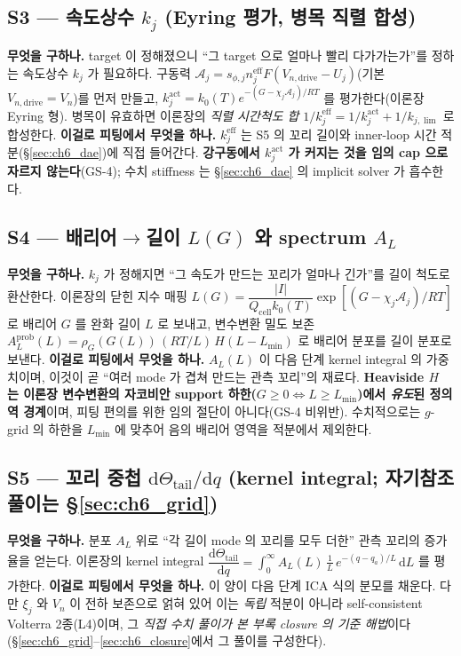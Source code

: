 \documentclass[11pt,a4paper]{article}
\newcommand{\dd}{\mathrm{d}}
\newcommand{\eff}{\mathrm{eff}}
\newcommand{\drive}{\mathrm{drive}}
\newcommand{\cell}{\mathrm{cell}}
\begin{document}
\subsection{S3 — 속도상수 $k_j$ (Eyring 평가, 병목 직렬 합성)}\label{sec:ch6_S3}
\textbf{무엇을 구하나.} target 이 정해졌으니 ``그 target 으로 얼마나 빨리 다가가는가''를 정하는 속도상수 $k_j$ 가
필요하다. 구동력 $\mathcal A_j=s_{\phi,j}n_j^{\eff}F(V_{n,\drive}-U_j)$(기본 $V_{n,\drive}=V_n$)를 먼저 만들고,
$k_j^{\mathrm{act}}=k_0(T)e^{-(G-\chi_j\mathcal A_j)/RT}$ 를 평가한다(이론장 Eyring 형). 병목이 유효하면 이론장의
\emph{직렬 시간척도 합} $1/k_j^{\eff}=1/k_j^{\mathrm{act}}+1/k_{j,\lim}$ 로 합성한다.
\textbf{이걸로 피팅에서 무엇을 하나.} $k_j^{\eff}$ 는 S5 의 꼬리 길이와 inner-loop 시간 적분(\S\ref{sec:ch6_dae})에
직접 들어간다. \textbf{강구동에서 $k_j^{\mathrm{act}}$ 가 커지는 것을 임의 cap 으로 자르지 않는다}(GS-4); 수치
stiffness 는 \S\ref{sec:ch6_dae} 의 implicit solver 가 흡수한다.

\subsection{S4 — 배리어$\to$길이 $L(G)$ 와 spectrum $A_L$}\label{sec:ch6_S4}
\textbf{무엇을 구하나.} $k_j$ 가 정해지면 ``그 속도가 만드는 꼬리가 얼마나 긴가''를 길이 척도로 환산한다. 이론장의
닫힌 지수 매핑 $L(G)=\dfrac{|I|}{Q_\cell k_0(T)}\exp[(G-\chi_j\mathcal A_j)/RT]$ 로 배리어 $G$ 를 완화 길이 $L$ 로
보내고, 변수변환 밀도 보존 $A_L^{\mathrm{prob}}(L)=\rho_G(G(L))\,(RT/L)\,H(L-L_{\min})$ 로 배리어 분포를 길이
분포로 보낸다.
\textbf{이걸로 피팅에서 무엇을 하나.} $A_L(L)$ 이 다음 단계 kernel integral 의 가중치이며, 이것이 곧 ``여러 mode
가 겹쳐 만드는 관측 꼬리''의 재료다. \textbf{Heaviside $H$ 는 이론장 변수변환의 자코비안 support
하한($G\ge0\Leftrightarrow L\ge L_{\min}$)에서 \emph{유도}된 정의역 경계}이며, 피팅 편의를 위한 임의 절단이
아니다(GS-4 비위반). 수치적으로는 $g$-grid 의 하한을 $L_{\min}$ 에 맞추어 음의 배리어 영역을 적분에서 제외한다.

\subsection{S5 — 꼬리 중첩 $\dd\Theta_\mathrm{tail}/\dd q$ (kernel integral; 자기참조 풀이는 \S\ref{sec:ch6_grid})}\label{sec:ch6_S5}
\textbf{무엇을 구하나.} 분포 $A_L$ 위로 ``각 길이 mode 의 꼬리를 모두 더한'' 관측 꼬리의 증가율을 얻는다. 이론장의
kernel integral $\dfrac{\dd\Theta_\mathrm{tail}}{\dd q}=\int_0^\infty A_L(L)\,\tfrac1L\,e^{-(q-q_a)/L}\,\dd L$ 를
평가한다. \textbf{이걸로 피팅에서 무엇을 하나.} 이 양이 다음 단계 ICA 식의 분모를 채운다. 다만 $\xi_j$ 와 $V_n$ 이
전하 보존으로 얽혀 있어 이는 \emph{독립} 적분이 아니라 self-consistent Volterra 2종(L4)이며, 그 \emph{직접 수치
풀이가 본 부록 closure 의 기준 해법}이다(\S\ref{sec:ch6_grid}--\ref{sec:ch6_closure}에서 그 풀이를 구성한다).
\end{document}
